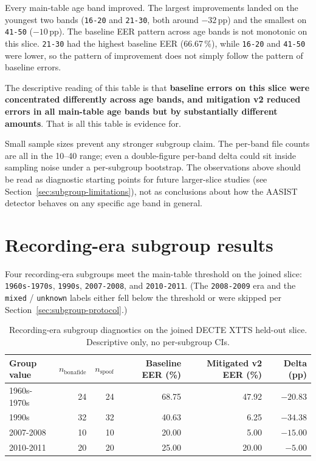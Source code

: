 Every main-table age band improved. The largest improvements landed
on the youngest two bands (\texttt{16-20} and \texttt{21-30}, both around $-32$\,pp)
and the smallest on \texttt{41-50} ($-10$\,pp). The baseline EER pattern
across age bands is not monotonic on this slice. \texttt{21-30} had the
highest baseline EER (66.67\,\%), while \texttt{16-20} and \texttt{41-50} were
lower, so the pattern of improvement does not simply follow the
pattern of baseline errors.

The descriptive reading of this table is that \textbf{baseline errors on
this slice were concentrated differently across age bands, and
mitigation v2 reduced errors in all main-table age bands but by
substantially different amounts}. That is all this table is
evidence for.

Small sample sizes prevent any stronger subgroup claim. The
per-band file counts are all in the 10--40 range; even a
double-figure per-band delta could sit inside sampling noise under
a per-subgroup bootstrap. The observations above should be read as
diagnostic starting points for future larger-slice studies (see
Section~\ref{sec:subgroup-limitations}), not as conclusions about how the AASIST detector
behaves on any specific age band in general.


\section{Recording-era subgroup results}
\label{sec:subgroup-recording-era}

Four recording-era subgroups meet the main-table threshold on the
joined slice: \texttt{1960s-1970s}, \texttt{1990s}, \texttt{2007-2008}, and
\texttt{2010-2011}. (The \texttt{2008-2009} era and the \texttt{mixed} / \texttt{unknown}
labels either fell below the threshold or were skipped per
Section~\ref{sec:subgroup-protocol}.)

\begin{table}[t]
\centering
\caption{Recording-era subgroup diagnostics on the joined DECTE XTTS held-out slice. Descriptive only, no per-subgroup CIs.}
\label{tab:subgroup-recording-era}
\scriptsize
\setlength{\tabcolsep}{4pt}
\begin{tabularx}{\linewidth}{X r r r r r}
\toprule
\textbf{Group value} & \textbf{$n_\text{bonafide}$} & \textbf{$n_\text{spoof}$} & \textbf{Baseline EER (\%)} & \textbf{Mitigated v2 EER (\%)} & \textbf{Delta (pp)} \\
\midrule
1960s-1970s & 24 & 24 & 68.75 & 47.92 & $-20.83$ \\
1990s       & 32 & 32 & 40.63 & 6.25  & $\mathbf{-34.38}$ \\
2007-2008   & 10 & 10 & 20.00 & 5.00  & $-15.00$ \\
2010-2011   & 20 & 20 & 25.00 & 20.00 & $-5.00$ \\
\bottomrule
\end{tabularx}
\end{table}


